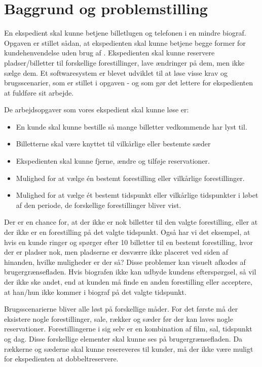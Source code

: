 \chapter{Baggrund og problemstilling}

En ekspedient skal kunne betjene billetlugen og telefonen i en mindre biograf. Opgaven er stillet sådan, at ekspedienten skal kunne betjene begge former for kundehenvendelse uden brug af . Ekspedienten skal kunne reservere pladser/billetter til forskellige forestillinger, lave ændringer på dem, men ikke sælge dem. Et softwaresystem er blevet udviklet til at løse visse krav og brugsscenarier, som er stillet i opgaven - og som gør det lettere for ekspedienten at fuldføre sit arbejde.

De arbejdsopgaver som vores ekspedient skal kunne løse er:
\begin{itemize}
  \item En kunde skal kunne bestille så mange billetter vedkommende har lyst til.
  \item Billetterne skal være knyttet til vilkårlige eller bestemte sæder
  \item Ekspedienten skal kunne fjerne, ændre og tilføje reservationer.
  \item Mulighed for at vælge én bestemt forestilling eller vilkårlige forestillinger.
  \item Mulighed for at vælge ét bestemt tidspunkt eller vilkårlige tidspunkter i løbet af den periode, de forskellige forestillinger bliver vist.
\end{itemize}

Der er en chance for, at der ikke er nok billetter til den valgte forestilling, eller at der ikke er en forestilling på det valgte tidspunkt. Også har vi det eksempel, at hvis en kunde ringer og spørger efter 10 billetter til en bestemt forestilling, hvor der er pladser nok, men pladserne er desværre ikke placeret ved siden af hinanden, hvilke muligheder er der så? Disse problemer kan visuelt afkodes af brugergrænsefladen. Hvis biografen ikke kan udbyde kundens efterspørgsel, så vil der ikke ske andet, end at kunden må finde en anden forestilling eller acceptere, at han/hun ikke kommer i biograf på det valgte tidspunkt.

Brugsscenarierne bliver alle løst på forskellige måder. For det første må der eksistere nogle forestillinger, sale, rækker og sæder før der kan laves nogle reservationer. Forestillingerne i sig selv er en kombination af film, sal, tidspunkt og dag. Disse forskellige elementer skal kunne ses på brugergrænsefladen. Da rækkerne og sæderne skal kunne resereveres til kunder, må der ikke være muligt for ekspedienten at dobbeltreservere.

